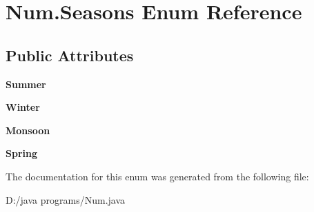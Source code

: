 \hypertarget{enum_num_1_1_seasons}{}\section{Num.\+Seasons Enum Reference}
\label{enum_num_1_1_seasons}
\subsection*{Public Attributes}
\begin{DoxyCompactItemize}
\item 
\mbox{\label{enum_num_1_1_seasons_a5290d8787fb496ee698f9130d94e251c}} 
{\bfseries Summer}
\item 
\mbox{\label{enum_num_1_1_seasons_a4be2eccd501a1bd599de7cc6e6233c22}} 
{\bfseries Winter}
\item 
\mbox{\label{enum_num_1_1_seasons_a017a31ee7a3e9104fb42162695303749}} 
{\bfseries Monsoon}
\item 
\mbox{\label{enum_num_1_1_seasons_a78050f26a8cc0761d98d4ab62a17c0f0}} 
{\bfseries Spring}
\end{DoxyCompactItemize}


The documentation for this enum was generated from the following file\+:\begin{DoxyCompactItemize}
\item 
D\+:/java programs/Num.\+java\end{DoxyCompactItemize}
